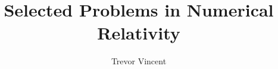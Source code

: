 

 
 \author{Trevor Vincent}
\title{Selected Problems in Numerical Relativity}



%
\setcounter{tocdepth}{2}









